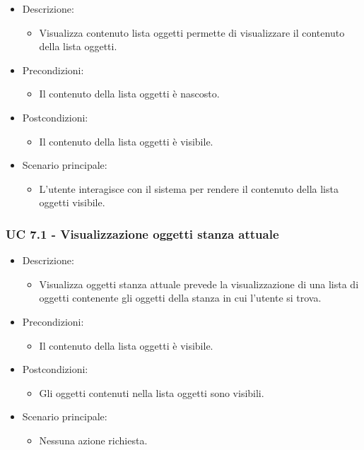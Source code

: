 \begin{itemize}

	\item Descrizione:
	\begin{itemize}
		\item Visualizza contenuto lista oggetti permette di visualizzare il contenuto della lista oggetti.
	\end{itemize}
	
	\item Precondizioni:
	\begin{itemize}
		\item Il contenuto della lista oggetti è nascosto.
	\end{itemize}
	
	\item Postcondizioni:
	\begin{itemize}
		\item Il contenuto della lista oggetti è visibile.
	\end{itemize}
	
	\item Scenario principale:
	\begin{itemize}
		\item L'utente interagisce con il sistema per rendere il contenuto della lista oggetti visibile.
	\end{itemize}
	
\end{itemize}

\subsubsection{UC 7.1 - Visualizzazione oggetti stanza attuale}
\begin{itemize}

	\item Descrizione:
	\begin{itemize}
		\item Visualizza oggetti stanza attuale prevede la visualizzazione di una lista di oggetti contenente gli oggetti della stanza in
cui l'utente si trova.
	\end{itemize}
	
	\item Precondizioni:
	\begin{itemize}
		\item Il contenuto della lista oggetti è visibile.
	\end{itemize}
	
	\item Postcondizioni:
	\begin{itemize}
		\item Gli oggetti contenuti nella lista oggetti sono visibili.
	\end{itemize}
	
	\item Scenario principale:
	\begin{itemize}
		\item Nessuna azione richiesta.
	\end{itemize}
	
\end{itemize}

